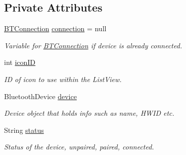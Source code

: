 \subsection*{Private Attributes}
\begin{DoxyCompactItemize}
\item 
\mbox{\label{classcom_1_1jack_1_1motorbikestatistics_1_1_b_t_device_item_a38830528ad49afd7ba09ced7ab55d6dc}} 
\hyperlink{classcom_1_1jack_1_1motorbikestatistics_1_1_b_t_connection}{B\+T\+Connection} \hyperlink{classcom_1_1jack_1_1motorbikestatistics_1_1_b_t_device_item_a38830528ad49afd7ba09ced7ab55d6dc}{connection} = null
\begin{DoxyCompactList}\small\item\em Variable for \hyperlink{classcom_1_1jack_1_1motorbikestatistics_1_1_b_t_connection}{B\+T\+Connection} if device is already connected. \end{DoxyCompactList}\item 
\mbox{\label{classcom_1_1jack_1_1motorbikestatistics_1_1_b_t_device_item_a77f7a3c228f87fa5e946fe77b310f805}} 
int \hyperlink{classcom_1_1jack_1_1motorbikestatistics_1_1_b_t_device_item_a77f7a3c228f87fa5e946fe77b310f805}{icon\+ID}
\begin{DoxyCompactList}\small\item\em ID of icon to use within the List\+View. \end{DoxyCompactList}\item 
\mbox{\label{classcom_1_1jack_1_1motorbikestatistics_1_1_b_t_device_item_acd943b008d77dcb5d72f8a65fa4986b9}} 
Bluetooth\+Device \hyperlink{classcom_1_1jack_1_1motorbikestatistics_1_1_b_t_device_item_acd943b008d77dcb5d72f8a65fa4986b9}{device}
\begin{DoxyCompactList}\small\item\em Device object that holds info such as name, H\+W\+ID etc. \end{DoxyCompactList}\item 
\mbox{\label{classcom_1_1jack_1_1motorbikestatistics_1_1_b_t_device_item_ae7a8756973644c5719d5faddf3fa7946}} 
String \hyperlink{classcom_1_1jack_1_1motorbikestatistics_1_1_b_t_device_item_ae7a8756973644c5719d5faddf3fa7946}{status}
\begin{DoxyCompactList}\small\item\em Status of the device, unpaired, paired, connected. \end{DoxyCompactList}\end{DoxyCompactItemize}


